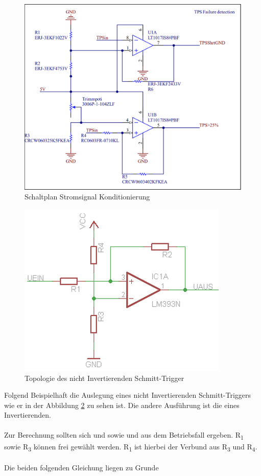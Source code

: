 \begin{figure}
	\centering
	\includegraphics[width=0.7\linewidth]{"bilder/TPS Failure detection"}
	\caption{Schaltplan Stromsignal Konditionierung}
	\label{fig:tps-failure-detection}
\end{figure}

\begin{figure}
	\centering
	\includegraphics[width=0.5\linewidth]{"bilder/nichtinvertierender Trigger"}
	\caption{Topologie des nicht Invertierenden Schmitt-Trigger \cite{SchmittTriggerMikrocontrollernet}}
	\label{fig:nichtinvertierender-trigger}
\end{figure}

Folgend Beispielhaft die Auslegung eines nicht Invertierenden Schmitt-Triggers wie er in der Abbildung \ref{fig:nichtinvertierender-trigger} zu sehen ist. Die andere Ausführung ist die eines Invertierenden.
\\
\\
Zur Berechnung sollten sich  und  sowie  und  aus dem Betriebsfall ergeben. R\textsubscript{1} sowie R\textsubscript{3} können frei gewählt werden. R\textsubscript{1} ist hierbei der Verbund aus R\textsubscript{3} und R\textsubscript{4}.
\\
\\
Die beiden folgenden Gleichung liegen zu Grunde


